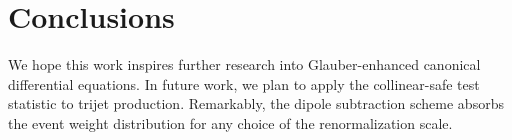 \section{Conclusions}\label{sec:conclusions}

We hope this work inspires further research into Glauber-enhanced
canonical differential equations. In future work, we plan to apply the
collinear-safe test statistic to trijet production. Remarkably, the
dipole subtraction scheme absorbs the event weight distribution for any
choice of the renormalization scale.

